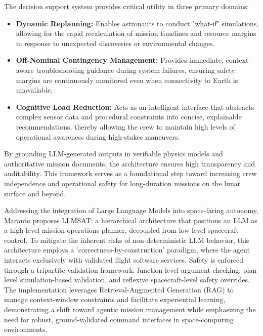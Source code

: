 The decision support system provides critical utility in three primary domains:
\begin{itemize}
    \item \textbf{Dynamic Replanning:} Enables astronauts to conduct "what-if" simulations, allowing for the rapid recalculation of mission timelines and resource margins in response to unexpected discoveries or environmental changes.
    \item \textbf{Off-Nominal Contingency Management:} Provides immediate, context-aware troubleshooting guidance during system failures, ensuring safety margins are continuously monitored even when connectivity to Earth is unavailable.
    \item \textbf{Cognitive Load Reduction:} Acts as an intelligent interface that abstracts complex sensor data and procedural constraints into concise, explainable recommendations, thereby allowing the crew to maintain high levels of operational awareness during high-stakes maneuvers.
\end{itemize}

By grounding LLM-generated outputs in verifiable physics models and authoritative mission documents, the architecture ensures high transparency and auditability. This framework serves as a foundational step toward increasing crew independence and operational safety for long-duration missions on the lunar surface and beyond.


Addressing the integration of Large Language Models into space-faring autonomy, Maranto \cite{maranto2024llmsat} proposes LLMSAT: a hierarchical architecture that positions an LLM as a high-level mission operations planner, decoupled from low-level spacecraft control. To mitigate the inherent risks of non-deterministic LLM behavior, this architecture employs a 'correctness-by-construction' paradigm, where the agent interacts exclusively with validated flight software services. Safety is enforced through a tripartite validation framework: function-level argument checking, plan-level simulation-based validation, and reflexive spacecraft-level safety overrides. The implementation leverages Retrieval-Augmented Generation (RAG) to manage context-window constraints and facilitate experiential learning, demonstrating a shift toward agentic mission management while emphasizing the need for robust, ground-validated command interfaces in space-computing environments.


